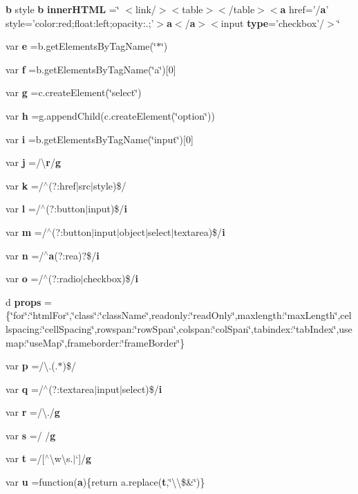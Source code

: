 \begin{DoxyCompactItemize}
{\bf b} style {\bf b} {\bf inner\-H\-T\-M\-L} =\char`\"{} $<$link/$>$$<$table$>$$<$/table$>$$<${\bf a} href='/{\bf a}' style='color\-:red;float\-:left;opacity\-:.;'$>${\bf a}$<$/{\bf a}$>$$<$input {\bf type}='checkbox'/$>$\char`\"{}
\item 
var {\bf e} =b.\-get\-Elements\-By\-Tag\-Name(\char`\"{}$\ast$\char`\"{})
\item 
var {\bf f} =b.\-get\-Elements\-By\-Tag\-Name(\char`\"{}a\char`\"{})[0]
\item 
var {\bf g} =c.\-create\-Element(\char`\"{}select\char`\"{})
\item 
var {\bf h} =g.\-append\-Child(c.\-create\-Element(\char`\"{}option\char`\"{}))
\item 
var {\bf i} =b.\-get\-Elements\-By\-Tag\-Name(\char`\"{}input\char`\"{})[0]
\item 
var {\bf j} =/\textbackslash{}{\bf r}/{\bf g}
\item 
var {\bf k} =/$^\wedge$(?\-:href$|$src$|$style)\$/
\item 
var {\bf l} =/$^\wedge$(?\-:button$|$input)\$/{\bf i}
\item 
var {\bf m} =/$^\wedge$(?\-:button$|$input$|$object$|$select$|$textarea)\$/{\bf i}
\item 
var {\bf n} =/$^\wedge${\bf a}(?\-:rea)?\$/{\bf i}
\item 
var {\bf o} =/$^\wedge$(?\-:radio$|$checkbox)\$/{\bf i}
\item 
d {\bf props} =\{\char`\"{}for\char`\"{}\-:\char`\"{}html\-For\char`\"{},\char`\"{}class\char`\"{}\-:\char`\"{}class\-Name\char`\"{},readonly\-:\char`\"{}read\-Only\char`\"{},maxlength\-:\char`\"{}max\-Length\char`\"{},cellspacing\-:\char`\"{}cell\-Spacing\char`\"{},rowspan\-:\char`\"{}row\-Span\char`\"{},colspan\-:\char`\"{}col\-Span\char`\"{},tabindex\-:\char`\"{}tab\-Index\char`\"{},usemap\-:\char`\"{}use\-Map\char`\"{},frameborder\-:\char`\"{}frame\-Border\char`\"{}\}
\item 
var {\bf p} =/\textbackslash{}.(.$\ast$)\$/
\item 
var {\bf q} =/$^\wedge$(?\-:textarea$|$input$|$select)\$/{\bf i}
\item 
var {\bf r} =/\textbackslash{}./{\bf g}
\item 
var {\bf s} =/ /{\bf g}
\item 
var {\bf t} =/[$^\wedge$\textbackslash{}w\textbackslash{}s.$|$`]/{\bf g}
\item 
var {\bf u} =function({\bf a})\{return a.\-replace({\bf t},\char`\"{}\textbackslash{}\textbackslash{}\$\&\char`\"{})\}

\end{DoxyCompactItemize}

